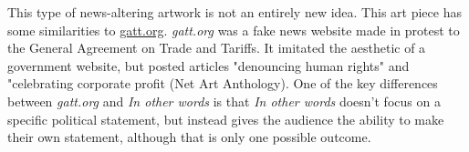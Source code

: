 \documentclass[12pt]{article}
\begin{document}
\begin{flushleft}
    This type of news-altering artwork is not an entirely new idea. This art
    piece has some similarities to
    \href{https://anthology.rhizome.org/gatt-org}{gatt.org}\footnotemark.
    \textit{gatt.org} was a fake news website made in protest to the General
    Agreement on Trade and Tariffs. It imitated the aesthetic of a government
    website, but posted articles "denouncing human rights" and "celebrating
    corporate profit (Net Art Anthology). One of the key differences between
    \textit{gatt.org} and \textit{In other words} is that \textit{In other
    words} doesn't focus on a specific political statement, but instead gives
    the audience the ability to make their own statement, although that is only
    one possible outcome.



\end{flushleft}
\end{document}
